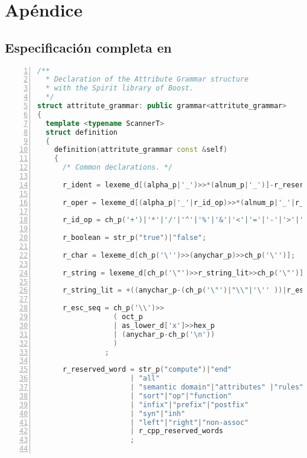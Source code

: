 \chapter{Apéndice}
\label{chap:appendix}

\section{Especificación completa en \spirit}
\label{append:grammarspirit}

\begin{lstlisting}[numbers=left,basicstyle=\tiny,language=C++,numberstyle=\tiny, numbersep=5pt]
/**
  * Declaration of the Attribute Grammar structure
  * with the Spirit library of Boost.
  */
struct attritute_grammar: public grammar<attritute_grammar>
{
  template <typename ScannerT>
  struct definition
  {
    definition(attritute_grammar const &self)
    {
      /* Common declarations. */

      r_ident = lexeme_d[(alpha_p|'_')>>*(alnum_p|'_')]-r_reserved_word;

      r_oper = lexeme_d[(alpha_p|'_'|r_id_op)>>*(alnum_p|'_'|r_id_op)];

      r_id_op = ch_p('+')|'*'|'/'|'^'|'%'|'&'|'<'|'='|'-'|'>'|'|'|'~'|'.'|','|'?';

      r_boolean = str_p("true")|"false";

      r_char = lexeme_d[ch_p('\'')>>(anychar_p)>>ch_p('\'')];

      r_string = lexeme_d[ch_p('\"')>>r_string_lit>>ch_p('\"')];

      r_string_lit = +((anychar_p-(ch_p('\"')|"\\"|'\'' ))|r_esc_seq);

      r_esc_seq = ch_p('\\')>>
                  ( oct_p
                  | as_lower_d['x']>>hex_p
                  | (anychar_p-ch_p('\n'))
                  )
                ;

      r_reserved_word = str_p("compute")|"end"
                      | "all"
                      | "semantic domain"|"attributes" |"rules"
                      | "sort"|"op"|"function"
                      | "infix"|"prefix"|"postfix"
                      | "syn"|"inh"
                      | "left"|"right"|"non-assoc"
                      | r_cpp_reserved_words
                      ;


\end{lstlisting}
